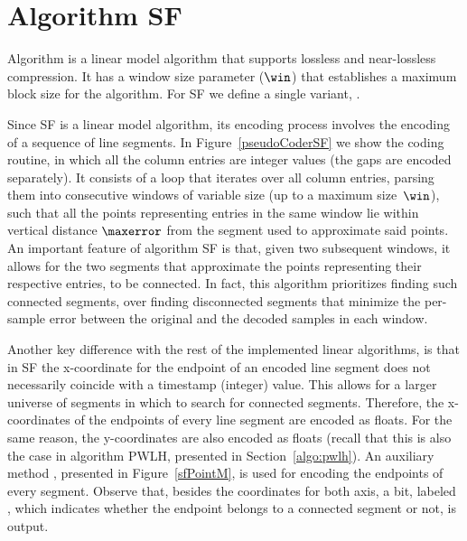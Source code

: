 

\section{Algorithm SF}
\label{algo:sf}


Algorithm \textit{\SFfull} \cite{coder:sf} is a linear model algorithm that supports lossless and near-lossless compression. It has a window size parameter ($\win$) that establishes a maximum block size for the algorithm. For SF we define a single variant, \maskalgo.


Since SF is a linear model algorithm, its encoding process involves the encoding of a sequence of line segments. In Figure~\ref{pseudoCoderSF} we show the coding routine, in which all the column entries are integer values (the gaps are encoded separately). It consists of a loop that iterates over all column entries, parsing them into consecutive windows of variable size (up to a maximum size~$\win$), such that all the points representing entries in the same window lie within vertical distance $\maxerror$ from the segment used to approximate said points. An important feature of algorithm SF is that, given two subsequent windows, it allows for the two segments that approximate the points representing their respective entries, to be connected. In fact, this algorithm prioritizes finding such connected segments, 
over finding disconnected segments that minimize the per-sample error between the original and the decoded samples in each window. 


\vspace{+5pt}



\clearpage


Another key difference with the rest of the implemented linear algorithms, is that in SF the x-coordinate for the endpoint of an encoded line segment does not necessarily coincide with a timestamp (integer) value. This allows for a larger universe of segments in which to search for connected segments. Therefore, the x-coordinates of the endpoints of every line segment are encoded as floats. For the same reason, the y-coordinates are also encoded as floats (recall that this is also the case in algorithm PWLH, presented in Section~\ref{algo:pwlh}). An auxiliary method \SFEncodePoint, presented in Figure~\ref{sfPointM}, is used for encoding the endpoints of every segment. Observe that, besides the coordinates for both axis, a bit, labeled \connectedS, which indicates whether the endpoint belongs to a connected segment or not, is output.


